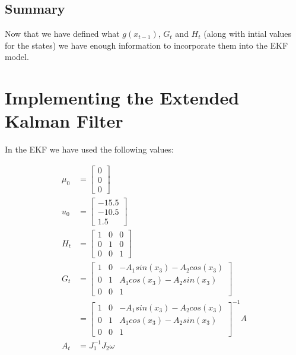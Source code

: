 \documentclass{article}
\begin{document}
\subsection{Summary}
\label{subsec:ekf_def_summary}

Now that we have defined what $g(x_{t - 1})$, $G_{t}$ and $H_{t}$ (along with
 intial values for the states) we have enough information to incorporate them
  into the EKF model.



\newpage
\section{Implementing the Extended Kalman Filter}

In the EKF we have used the following values:

\begin{align*}
	\mu_{0} &= 
		\begin{bmatrix}
			0 \\
			0 \\
			0
		\end{bmatrix} \\
	u_{0} &= 
	\begin{bmatrix}
		-15.5 \\
		-10.5 \\
		1.5
	\end{bmatrix} \\
	H_{t} &=
	\begin{bmatrix}
		1 & 0 & 0 \\
		0 & 1 & 0 \\
		0 & 0 & 1
	\end{bmatrix} \\
	G_{t} 
		&= \begin{bmatrix}
			1 & 0 & -A_{1} sin(x_{3}) - A_{2} cos(x_{3})  \\
			0 & 1 & A_{1} cos(x_{3}) - A_{2} sin(x_{3}) \\
			0 & 0 & 1
		\end{bmatrix} \\
	    &= 
	        \begin{bmatrix}
       			1 & 0 & -A_{1} sin(x_{3}) - A_{2} cos(x_{3})  \\
       			0 & 1 & A_{1} cos(x_{3}) - A_{2} sin(x_{3}) \\
       			0 & 0 & 1
	        \end{bmatrix}^{-1}
	        A \\
	A_{t}
		&= J_{1}^{-1} J_{2} \omega \\		

\end{align*}
\end{document}
